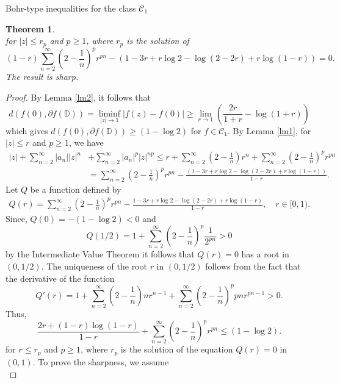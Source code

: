 \documentclass[12pt,a4paper,reqno]{amsart}
\theoremstyle{definition}
\theoremstyle{plain}
\newtheorem{theorem}[definition]{Theorem}
\numberwithin{equation}{section}
\begin{document}
\begin{section}{Bohr-type inequalities for the class $\mathcal{C}_1$}
\begin{theorem}
\begin{equation}
\end{equation}
for $|z| \le r_p$ and $p \ge 1$, where $r_p$ is the solution of
\begin{equation*}
(1-r)\sum_{n=2}^{\infty} \left( 2-\frac{1}{n} \right)^{p} r^{pn}- (1-3 r+r \log2-\log(2-2 r)+r \log(1-r))=0.
\end{equation*}
The result is sharp.
\end{theorem}
\begin{proof}
By Lemma \ref{lm2}, it follows that
\begin{equation}\label{eq5}
d(f(0), \partial{f(\mathbb{D})})= \liminf \limits_{|z| \rightarrow 1} |f(z)-f(0)|
 \ge \lim \limits_{r \rightarrow 1} \left(\frac{2r}{1+r}- \log(1+r)\right)
\end{equation}
which gives $d(f(0), \partial{f(\mathbb{D})}) \ge (1-\log{2})$ for $f \in \mathcal{C}_1$. By Lemma \ref{lm1},  for $|z| \le r$ and $p \ge 1$, we have
\begin{align*}
|z|+ \sum_{n=2}^{\infty} |a_n| |z|^n&+ \sum_{n=2}^{\infty} |a_n|^{p} |z|^{np} \le r+ \sum_{n=2}^{\infty} \left( 2-\frac{1}{n} \right) r^{n}+ \sum_{n=2}^{\infty} \left( 2-\frac{1}{n} \right)^{p} r^{pn}\\
&=\sum_{n=2}^{\infty} \left( 2-\frac{1}{n} \right)^{p} r^{pn}- \frac{(1-3 r+r \log2-\log(2-2 r)+r \log(1-r))}{1-r}.
\end{align*}
Let  $Q$ be a function  defined by
\begin{align*}
Q(r)=\sum_{n=2}^{\infty} \left( 2-\frac{1}{n} \right)^{p} r^{pn}- \frac{1-3 r+r \log2-\log(2-2 r)+r \log(1-r)}{1-r}, \quad r\in [0, 1).
\end{align*}
Since, $Q(0)=-(1-\log 2)<0$ and
 \[
 Q(1/2)
 = 1+ \sum_{n=2}^{\infty} \left( 2-\frac{1}{n} \right)^{p} \frac{1}{2^{pn}}> 0
\]
by the Intermediate Value Theorem it follows that $Q(r)=0$ has a root in $(0, 1/2)$.
The uniqueness of the root $r$ in $(0, 1/2)$ follows from the fact that the derivative of the  function \[Q'(r)=1+ \sum_{n=2}^{\infty} \left( 2-\frac{1}{n} \right)n r^{n-1}+ \sum_{n=2}^{\infty} \left( 2-\frac{1}{n} \right)^{p}pn r^{p n-1}>0.\]
 Thus,
\begin{equation*}
\frac{2 r+(1-r) \log(1-r)}{1-r}+\sum_{n=2}^{\infty} \left( 2-\frac{1}{n} \right)^{p} r^{pn} \le  (1 - \log{2}).
\end{equation*}
 for $r \le r_p$ and $p \ge 1$, where $r_p$ is the solution of the equation $Q(r)=0$ in $(0, 1).$
To prove the sharpness, we assume
\begin{equation}\label{eq7}

\end{equation}
\end{proof}
\end{section}
\end{document}
